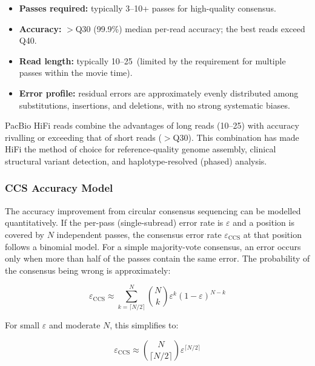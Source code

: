\begin{itemize}[nosep]
  \item \textbf{Passes required:} typically 3--10+ passes for high-quality consensus.
  \item \textbf{Accuracy:} $>$Q30 (99.9\%) median per-read accuracy; the best reads exceed Q40.
  \item \textbf{Read length:} typically 10--25\kilobase\ (limited by the requirement for multiple passes within the movie time).
  \item \textbf{Error profile:} residual errors are approximately evenly distributed among substitutions, insertions, and deletions, with no strong systematic biases.
\end{itemize}

\begin{keyconcept}[title={HiFi: The Best of Both Worlds}]
PacBio HiFi reads combine the advantages of long reads (10--25\kilobase) with accuracy rivalling or exceeding that of short reads ($>$Q30). This combination has made HiFi the method of choice for reference-quality genome assembly, clinical structural variant detection, and haplotype-resolved (phased) analysis.
\end{keyconcept}


\subsubsection{CCS Accuracy Model}
\label{subsubsec:longread:ccs-model}

The accuracy improvement from circular consensus sequencing can be modelled quantitatively. If the per-pass (single-subread) error rate is $\varepsilon$ and a position is covered by $N$ independent passes, the consensus error rate $\varepsilon_{\text{CCS}}$ at that position follows a binomial model. For a simple majority-vote consensus, an error occurs only when more than half of the passes contain the same error. The probability of the consensus being wrong is approximately:

\begin{equation}
\varepsilon_{\text{CCS}} \approx \sum_{k=\lceil N/2 \rceil}^{N} \binom{N}{k} \varepsilon^k (1-\varepsilon)^{N-k}
\label{eq:longread:ccs-accuracy}
\end{equation}

For small $\varepsilon$ and moderate $N$, this simplifies to:

\begin{equation}
\varepsilon_{\text{CCS}} \approx \binom{N}{\lceil N/2 \rceil} \varepsilon^{\lceil N/2 \rceil}
\label{eq:longread:ccs-approx}
\end{equation}


